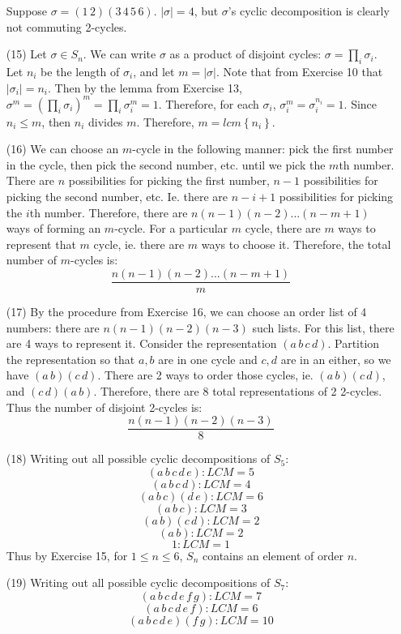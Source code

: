 \documentclass[12pt]{article}
\begin{document}
\begin{itemize}
Suppose $\sigma = (1 \, 2)(3 \, 4 \, 5 \, 6)$. $|\sigma| = 4$, but $\sigma$'s cyclic decomposition is clearly not commuting 2-cycles.
\item[(15)]
Let $\sigma \in S_n$. We can write $\sigma$ as a product of disjoint cycles: $\sigma = \prod_i \sigma_i$. Let $n_i$ be the length of $\sigma_i$, and let $m = |\sigma|$. Note that from Exercise 10 that $|\sigma_i| = n_i$. Then by the lemma from Exercise 13, $\sigma^m = (\prod_i \sigma_i)^m = \prod_i \sigma_i^m = 1$. Therefore, for each $\sigma_i$, $\sigma_i^m = \sigma_i^{n_i} = 1$. Since $n_i \leq m$, then $n_i$ divides $m$. Therefore, $m = lcm\left\lbrace n_i \right\rbrace$.
\item[(16)]
We can choose an $m$-cycle in the following manner: pick the first number in the cycle, then pick the second number, etc. until we pick the $m$th number. There are $n$ possibilities for picking the first number, $n - 1$ possibilities for picking the second number, etc. Ie. there are $n - i + 1$ possibilities for picking the $i$th number. Therefore, there are $n(n - 1)(n - 2)...(n - m + 1)$ ways of forming an $m$-cycle. For a particular $m$ cycle, there are $m$ ways to represent that $m$ cycle, ie. there are $m$ ways to choose it. Therefore, the total number of $m$-cycles is:
$$\frac{n(n - 1)(n - 2)...(n - m + 1)}{m}$$
\item[(17)]
By the procedure from Exercise 16, we can choose an order list of 4 numbers: there are $n(n - 1)(n - 2)(n - 3)$ such lists. For this list, there are 4 ways to represent it. Consider the representation $(a \, b \, c \, d)$. Partition the representation so that $a, b$ are in one cycle and $c, d$ are in an either, so we have $(a \, b)(c \, d)$. There are 2 ways to order those cycles, ie. $(a \, b)(c \, d)$, and $(c \, d)(a \, b)$. Therefore, there are 8 total representations of 2 2-cycles. Thus the number of disjoint 2-cycles is:
$$\frac{n(n - 1)(n - 2)(n - 3)}{8}$$
\item[(18)]
Writing out all possible cyclic decompositions of $S_5$:
$$(a \, b \, c \, d \, e): LCM = 5$$
$$(a \, b \, c \, d): LCM = 4$$
$$(a \, b \, c)(d \, e): LCM = 6$$
$$(a \, b \, c): LCM = 3$$
$$(a \, b)(c \, d): LCM = 2$$
$$(a \, b): LCM = 2$$
$$1: LCM = 1$$
Thus by Exercise 15, for $1 \leq n \leq 6$, $S_n$ contains an element of order $n$.
\item[(19)]
Writing out all possible cyclic decompositions of $S_7$:
$$(a \, b \, c \, d \, e \, f \, g): LCM = 7$$
$$(a \, b \, c \, d \, e \, f): LCM = 6$$
$$(a \, b \, c \, d \, e)(f \, g): LCM = 10$$

\end{itemize}
\end{document}
